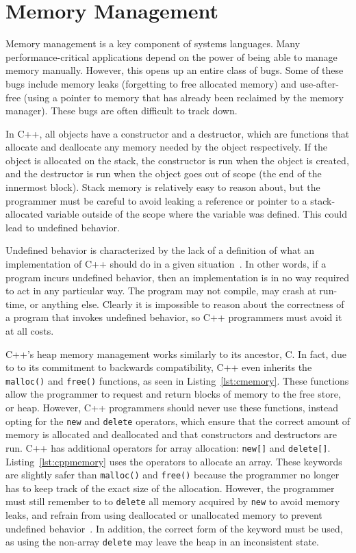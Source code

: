 \documentclass[finalcopy]{srpaper}
\begin{document}
\section{Memory Management}

Memory management is a key component of systems languages. Many
performance-critical applications depend on the power of being able to manage
memory manually. However, this opens up an entire class of bugs. Some of these
bugs include memory leaks (forgetting to free allocated memory) and
use-after-free (using a pointer to memory that has already been reclaimed by
the memory manager). These bugs are often difficult to track down.

In C++, all objects have a constructor and a destructor, which are functions
that allocate and deallocate any memory needed by the object respectively. If
the object is allocated on the stack, the constructor is run when the object
is created, and the destructor is run when the object goes out of scope (the
end of the innermost block). Stack memory is relatively easy to reason about,
but the programmer must be careful to avoid leaking a reference or pointer to
a stack-allocated variable outside of the scope where the variable was defined.
This could lead to undefined behavior.

Undefined behavior is characterized by the lack of a definition of what an
implementation of C++ should do in a given situation~\cite{iso/iec}. In other
words, if a program incurs undefined behavior, then an implementation is in no
way required to act in any particular way. The program may not compile, may
crash at run-time, or anything else. Clearly it is impossible to reason about
the correctness of a program that invokes undefined behavior, so C++ programmers
must avoid it at all costs.

C++'s heap memory management works similarly to its ancestor, C. In fact, due
to to its commitment to backwards compatibility, C++ even inherits the
\texttt{malloc()} and \texttt{free()} functions, as seen in
Listing~\ref{lst:cmemory}. These functions allow the programmer to request and
return blocks of memory to the free store, or heap. However, C++ programmers
should never use these functions, instead opting for the \texttt{new} and
\texttt{delete} operators, which ensure that the correct amount of memory is
allocated and deallocated and that constructors and destructors are run. C++
has additional operators for array allocation: \texttt{new[]} and
\texttt{delete[]}. Listing~\ref{lst:cppmemory} uses the operators to allocate
an array. These keywords are slightly safer than \texttt{malloc()} and
\texttt{free()} because the programmer no longer has to keep track of the exact
size of the allocation. However, the programmer must still remember to to
\texttt{delete} all memory acquired by \texttt{new} to avoid memory leaks, and
refrain from using deallocated or unallocated memory to prevent undefined
behavior~\cite{stroustrup2013the}. In addition, the correct form of the keyword
must be used, as using the non-array \texttt{delete} may leave the heap in an
inconsistent state.
\end{document}
